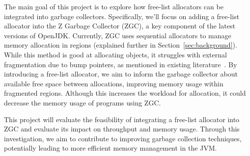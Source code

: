 The main goal of this project is to explore how free-list allocators can be integrated into garbage collectors. Specifically, we'll focus on adding a free-list allocator into the Z Garbage Collector (ZGC), a key component of the latest versions of OpenJDK. Currently, ZGC uses sequential allocators to manage memory allocation in regions (explained further in Section~\ref{sec:background}). While this method is good at allocating objects, it struggles with external fragmentation due to bump pointers, as mentioned in existing literature~\cite{TODO:bump}. By introducing a free-list allocator, we aim to inform the garbage collector about available free space between allocations, improving memory usage within fragmented regions. Although this increases the workload for allocation, it could decrease the memory usage of programs using ZGC.

This project will evaluate the feasibility of integrating a free-list allocator into ZGC and evaluate its impact on throughput and memory usage. Through this investigation, we aim to contribute to improving garbage collection techniques, potentially leading to more efficient memory management in the JVM.
